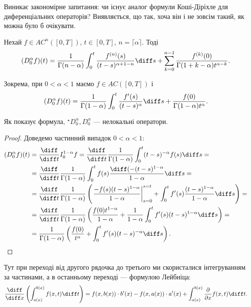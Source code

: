 Виникає закономірне запитання: чи існує аналог формули Коші-Діріхле для диференціальних операторів? Виявляється, що так, хоча він і не зовсім такий, як можна було б очікувати.

\begin{theorem}
    Нехай $f \in AC^n([0, T])$, $t \in [0, T]$, $n = \lceil \alpha \rceil$. Тоді
    \begin{equation}
        (D_0^\alpha f) (t) = \frac{1}{\Gamma(n - \alpha)} \int_0^t \frac{f^{(n)}(s)}{(t - s)^{\alpha + 1 - n}} \diff s + \sum_{k = 0}^{n - 1} \frac{f^{(k)}(0)}{\Gamma(1 + k - \alpha) t^{\alpha - k}}.
    \end{equation}
\end{theorem}
\begin{example}
    Зокрема, при $0 < \alpha < 1$ маємо $f \in AC([0, T])$ і
    \begin{equation}
        (D_0^\alpha f) (t) = \frac{1}{\Gamma(1 - \alpha)} \int_0^t \frac{f'(s)}{(t - s)^\alpha} \diff s + \frac{f(0)}{\Gamma(1 - \alpha) t^\alpha}.
    \end{equation}
\end{example}
\begin{remark}
    Як показує формула, ${}^\star D_0^\alpha, D_0^\alpha$ --- нелокальні оператори.    
\end{remark}
\begin{proof}
    Доведемо частинний випадок $0 < \alpha < 1$:
    \begin{equation}
        \begin{aligned}
            (D_0^\alpha f)(t) &= \frac{\diff}{\diff t} I_0^{1 - \alpha} f = \frac{\diff}{\diff t} \frac{1}{\Gamma(1 - \alpha)} \int_0^t (t - s)^{-\alpha} f(s) \diff s = \\
            &= \frac{\diff}{\diff t} \frac{1}{\Gamma(1 - \alpha)} \int_0^t f(s) \frac{\diff (-(t-s)^{1-\alpha}}{1 - \alpha} \diff s = \\
            &= \frac{\diff}{\diff t} \frac{1}{\Gamma(1 - \alpha)} \left( \left. \frac{-f(s)(t-s)^{1-\alpha}}{1 - \alpha} \right|_{s = 0}^{s = t} + \int_0^t f'(s) \frac{(t - s)^{1- \alpha}}{1 - \alpha} \diff s \right) = \\
            &= \frac{\diff}{\diff t} \frac{1}{\Gamma(1 - \alpha)} \left( \frac{f(0) t^{1-\alpha}}{1 - \alpha} + \frac{1}{1 - \alpha} \int_0^t f'(s) (t - s)^{1 - \alpha} \diff s \right) = \\
            &= \frac{1}{\Gamma(1 - \alpha)} \left( \frac{f(0)}{t^\alpha} + \int_0^t f'(s) (t - s)^{- \alpha} \diff s \right).
        \end{aligned}
    \end{equation}
\end{proof}
\begin{remark}
    Тут при переході від другого рядочка до третього ми скористалися інтегруванням за частинами, а в останньому переході --- формулою Лейбніца:
    \begin{equation}
        \frac{\diff}{\diff x} \left(\int_{a(x)}^{b(x)} f(x,t) \diff t \right) = f(x, b(x)) \cdot b'(x) - f(x, a(x)) \cdot a'(x) + \int_{a(x)}^{b(x)} \frac{\partial}{\partial x} f(x,t) \diff t.    
    \end{equation}
\end{remark}

